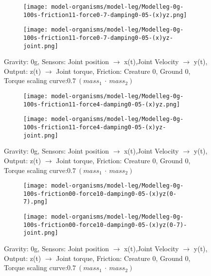 \documentclass[main]{subfiles}
\begin{document}
\begin{figure}[H]
	\centering
		\begin{subfigure}[c]{0.45\textwidth}
	\texttt{[image: model-organisms/model-leg/Modelleg-0g-100s-friction11-force0-7-damping0-05-(x)yz.png]}
		\end{subfigure}
	\begin{subfigure}[c]{0.45\textwidth}
	\texttt{[image: model-organisms/model-leg/Modelleg-0g-100s-friction11-force0-7-damping0-05-(x)yz-joint.png]}
		\end{subfigure}
	\caption[Figure of chaotic behaviors in range 2.4-3.19]{Gravity: 0g, Sensors:  Joint position \(\rightarrow\) x(t),Joint Velocity \(\rightarrow\) y(t), Output: z(t) \(\rightarrow\) Joint torque, Friction: Creature 0, Ground 0, Torque scaling curve:\(0.7~(mass_1~\cdot~mass_2)\)}

	\label{figure:z-2.4-3.19-chaotictrajectories}
\end{figure}

\begin{figure}[H]
	\centering
		\begin{subfigure}[c]{0.45\textwidth}
	\texttt{[image: model-organisms/model-leg/Modelleg-0g-100s-friction11-force4-damping0-05-(x)yz.png]}
		\end{subfigure}
	\begin{subfigure}[c]{0.45\textwidth}
	\texttt{[image: model-organisms/model-leg/Modelleg-0g-100s-friction11-force4-damping0-05-(x)yz-joint.png]}
		\end{subfigure}
	\caption[Figure of chaotic behaviors in range 2.4-3.19]{Gravity: 0g, Sensors:  Joint position \(\rightarrow\) x(t),Joint Velocity \(\rightarrow\) y(t), Output: z(t) \(\rightarrow\) Joint torque, Friction: Creature 0, Ground 0, Torque scaling curve:\(0.7~(mass_1~\cdot~mass_2)\)}

	\label{figure:z-2.4-3.19-chaotictrajectories}
\end{figure}

\begin{figure}[H]
	\centering
		\begin{subfigure}[c]{0.45\textwidth}
	\texttt{[image: model-organisms/model-leg/Modelleg-0g-100s-friction00-force10-damping0-05-(x)yz(0-7).png]}
		\end{subfigure}
	\begin{subfigure}[c]{0.45\textwidth}
	\texttt{[image: model-organisms/model-leg/Modelleg-0g-100s-friction00-force10-damping0-05-(x)yz(0-7)-joint.png]}
		\end{subfigure}
	\caption[Figure of chaotic behaviors in range 2.4-3.19]{Gravity: 0g, Sensors:  Joint position \(\rightarrow\) x(t),Joint Velocity \(\rightarrow\) y(t), Output: z(t) \(\rightarrow\) Joint torque, Friction: Creature 0, Ground 0, Torque scaling curve:\(0.7~(mass_1~\cdot~mass_2)\)}

	\label{figure:z-2.4-3.19-chaotictrajectories}
\end{figure}
\end{document}
